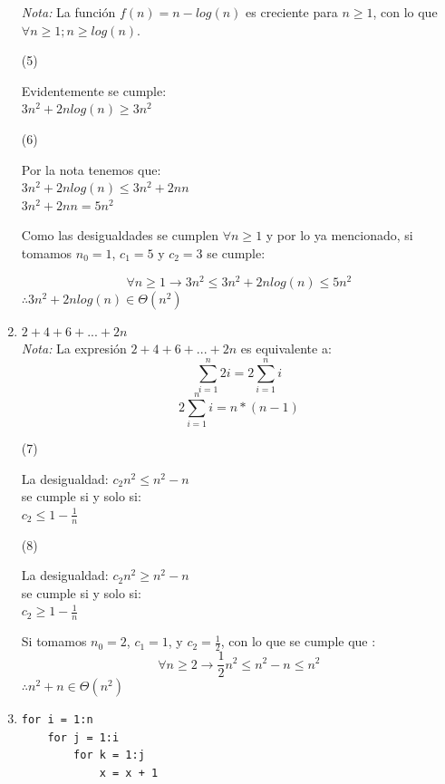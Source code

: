 \documentclass{article}
\begin{document}
\begin{enumerate}
    \textit{Nota: } La función $f(n) = n -log(n)$ es creciente para $n \geq 1$, con lo que $\forall  n \geq 1; n\geq log(n)$.
    \begin{multicols}{2}
    \begin{center}(5) \end{center}
    Evidentemente se cumple:  \\
     $3n^2 + 2  n log(n) \geq 3n^2$
    \columnbreak
     \begin{center}(6) \end{center}
    Por la nota tenemos que:\\
    $3n^2 + 2  n log(n) \leq  3n^2 + 2  n  n$\\
    $ 3n^2 + 2  n  n =  5n^2$
    \end{multicols}
    
    
    Como las desigualdades se cumplen $\forall n \geq 1$ y por lo ya mencionado, si tomamos $n_0 = 1$, $c_1 = 5$ y $c_2 = 3$ se cumple: 
    
    \[\forall n \geq 1 \rightarrow 3  n^2 \leq 3n^2 + 2  n log(n)  \leq 5  n^2 \]
    $\therefore 3n^2 + 2  n log(n) \in \Theta(n^2)$
    \item $2+4+6+... +2n$ \\
    \textit{Nota:} La expresión $2+4+6+...+2  n$ es equivalente a:
    \[\sum_{i=1}^n 2 i = 2 \sum_{i=1}^n i \]
    \[ 2 \sum_{i=1}^n i = n *(n-1)\]
    
    \begin{multicols}{2}
    \begin{center}(7) \end{center}
     La desigualdad: $c_2  n^2 \leq  n^2-n$ \\
         se cumple si y solo si: \\
         $c_2 \leq 1 - \frac{1}{n}$ 
    \columnbreak
     \begin{center}(8) \end{center}
    La desigualdad: $c_2  n^2 \geq  n^2-n$ \\
         se cumple si y solo si: \\
         $c_2 \geq 1 - \frac{1}{n}$
    \end{multicols}
    Si tomamos $n_0 = 2$, $c_1 =1$, y $c_2 = \frac{1}{2}$, con lo que se cumple que : 
    \[\forall n \geq 2 \rightarrow \frac{1}{2}  n^2 \leq n^2 -n  \leq n^2 \]
    $\therefore n^2 + n  \in \Theta(n^2)$
    
    \item 
    \begin{verbatim}
for i = 1:n
    for j = 1:i
        for k = 1:j
            x = x + 1
    \end{verbatim}
    

\end{enumerate}
\end{document}

